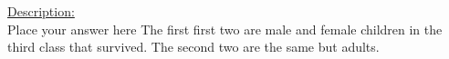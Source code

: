 \documentclass[12pt,letterpaper,final]{article}\usepackage[]{graphicx}\usepackage[]{xcolor}
\begin{document}
\begin{enumerate}
\begin{enumerate}
\underline{Description:} \\
Place your answer here
The first first two are male and female children in the third class that survived. The second two are the same but adults.

\end{enumerate}


\end{enumerate}
\end{document}
